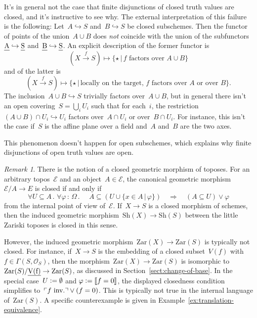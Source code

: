 \documentclass[10pt,reqno,a4paper]{amsbook}
\makeatletter
\theoremstyle{definition}
\theoremstyle{plain}
\theoremstyle{remark}
\newtheorem{rem}[defn]{Remark}
\newcommand{\E}{\mathcal{E}}
\renewcommand{\O}{\mathcal{O}}
\let\oldul\ul
\renewcommand{\ul}[1]{\text{\oldul{$#1$}}}
\newcommand{\Sh}{\mathrm{Sh}}
\newcommand{\Zar}{\mathrm{Zar}}
\newcommand{\?}{\,{:}\,}
\renewcommand{\_}{\mathpunct{.}\,}
\newcommand{\speak}[1]{\ulcorner\text{\textnormal{#1}}\urcorner}
\newcommand{\brak}[1]{{\llbracket{#1}\rrbracket}}
\newcommand{\inv}{inv.\@}
\newcommand{\xra}{\xrightarrow}
\newcommand{\defeq}{\vcentcolon=}
\makeatother
\begin{document}
It's in general not the case that finite disjunctions of closed truth
values are closed, and it's instructive to see why. The external interpretation
of this failure is the following: Let~$A \hookrightarrow S$ and~$B
\hookrightarrow S$ be closed subschemes. Then the functor of points of the
union~$A \cup B$ does \emph{not} coincide with the union of the
subfunctors~$\ul{A} \hookrightarrow \ul{S}$ and~$\ul{B} \hookrightarrow
\ul{S}$. An explicit description of the former functor is
\[ (X \xra{f} S) \longmapsto
  \{ \star \,|\, \text{$f$ factors over~$A \cup B$} \} \]
and of the latter is
\[ (X \xra{f} S) \longmapsto
  \{ \star \,|\, \text{locally on the target, $f$ factors over~$A$ or over~$B$} \}. \]
The inclusion~$A \cup B \hookrightarrow S$ trivially factors over~$A \cup B$,
but in general there isn't an open covering~$S = \bigcup_i U_i$ such that for
each~$i$, the restriction~$(A \cup B) \cap U_i \hookrightarrow U_i$ factors
over~$A \cap U_i$ or over~$B \cap U_i$. For instance, this isn't the case
if~$S$ is the affine plane over a field and~$A$ and~$B$ are the two axes.

This phenomenon doesn't happen for open subschemes, which explains why finite
disjunctions of open truth values are open.

\begin{rem}\label{rem:closed-geometric-morphism}
There is the notion of a closed geometric morphism of toposes. For
an arbitrary topos~$\E$ and an object~$A \in \E$, the canonical geometric
morphism~$\E/A \to E$ is closed if and only if
\[ \forall U \subseteq A\_
  \forall \varphi \? \Omega\_ \quad
  A \subseteq (U \cup \{ x \in A \,|\, \varphi \}) \quad\Longrightarrow\quad
  (A \subseteq U) \vee \varphi \]
from the internal point of view of~$\E$. If~$X \to S$ is a closed morphism of
schemes, then the induced geometric morphism~$\Sh(X) \to \Sh(S)$ between the
little Zariski toposes is closed in this sense.

However, the induced geometric morphism~$\Zar(X) \to \Zar(S)$ is typically not
closed. For instance, if~$X \to S$ is the embedding of a closed subset~$V(f)$
with~$f \in \Gamma(S,\O_S)$, then the morphism~$\Zar(X) \to \Zar(S)$ is
isomorphic to~$\Zar(S)/\ul{V(f)} \to \Zar(S)$, as discussed in
Section~\ref{sect:change-of-base}. In the special case~$U \defeq \emptyset$ and
$\varphi \defeq \brak{f = 0}$, the displayed closedness condition simplifies
to~$\speak{$f$ \inv} \vee (f = 0)$. This is typically not true in the internal
language of~$\Zar(S)$. A specific counterexample is given in
Example~\ref{ex:translation-equivalence}.
\end{rem}
\end{document}

